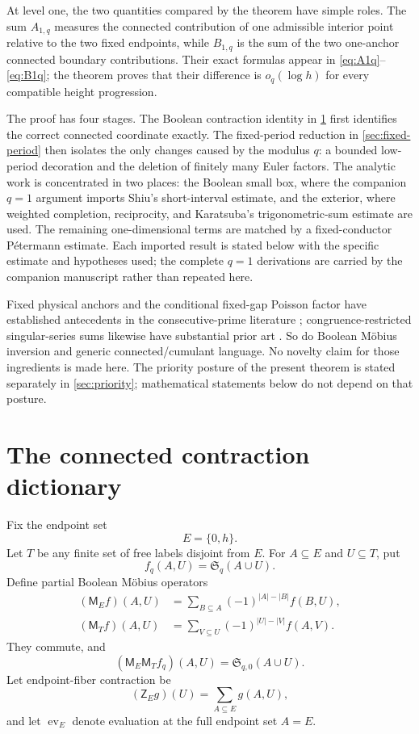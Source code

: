 \documentclass[11pt]{article}
\theoremstyle{definition}
\theoremstyle{remark}
\newcommand{\SSer}{\mathfrak S}
\newcommand{\Mob}{\mathsf M}
\newcommand{\ZE}{\mathsf Z_E}
\newcommand{\evE}{\operatorname{ev}_E}
\newcommand{\1}{\mathbf 1}
\begin{document}
At level one, the two quantities compared by the theorem have simple roles.  The sum $A_{1,q}$ measures the connected contribution of one admissible interior point relative to the two fixed endpoints, while $B_{1,q}$ is the sum of the two one-anchor connected boundary contributions.  Their exact formulas appear in \eqref{eq:A1q}--\eqref{eq:B1q}; the theorem proves that their difference is $o_q(\log h)$ for every compatible height progression.

The proof has four stages.  The Boolean contraction identity in \cref{sec:dictionary} first identifies the correct connected coordinate exactly.  The fixed-period reduction in \cref{sec:fixed-period} then isolates the only changes caused by the modulus $q$: a bounded low-period decoration and the deletion of finitely many Euler factors.  The analytic work is concentrated in two places: the Boolean small box, where the companion $q=1$ argument imports Shiu's short-interval estimate, and the exterior, where weighted completion, reciprocity, and Karatsuba's trigonometric-sum estimate are used.  The remaining one-dimensional terms are matched by a fixed-conductor P\'etermann estimate.  Each imported result is stated below with the specific estimate and hypotheses used; the complete $q=1$ derivations are carried by the companion manuscript \cite{DorseyPointwise2026} rather than repeated here.

Fixed physical anchors and the conditional fixed-gap Poisson factor have established antecedents in the consecutive-prime literature \cite{GoldstonLedoan2011,LOS}; congruence-restricted singular-series sums likewise have substantial prior art \cite{Kuperberg2025}.  So do Boolean M\"obius inversion and generic connected/cumulant language.  No novelty claim for those ingredients is made here.  The priority posture of the present theorem is stated separately in \cref{sec:priority}; mathematical statements below do not depend on that posture.

\section{The connected contraction dictionary}\label{sec:dictionary}

Fix the endpoint set
\[
E=\{0,h\}.
\]
Let $T$ be any finite set of free labels disjoint from $E$.  For $A\subseteq E$ and $U\subseteq T$, put
\[
f_q(A,U)=\SSer_q(A\cup U).
\]
Define partial Boolean M\"obius operators
\begin{align}
(\Mob_E f)(A,U)
&=\sum_{B\subseteq A}(-1)^{|A|-|B|}f(B,U),\label{eq:ME}\\
(\Mob_T f)(A,U)
&=\sum_{V\subseteq U}(-1)^{|U|-|V|}f(A,V).\label{eq:MT}
\end{align}
They commute, and
\[
(\Mob_E\Mob_Tf_q)(A,U)=\SSer_{q,0}(A\cup U).
\]
Let endpoint-fiber contraction be
\[
(\ZE g)(U)=\sum_{A\subseteq E}g(A,U),
\]
and let $\evE$ denote evaluation at the full endpoint set $A=E$.
\end{document}
